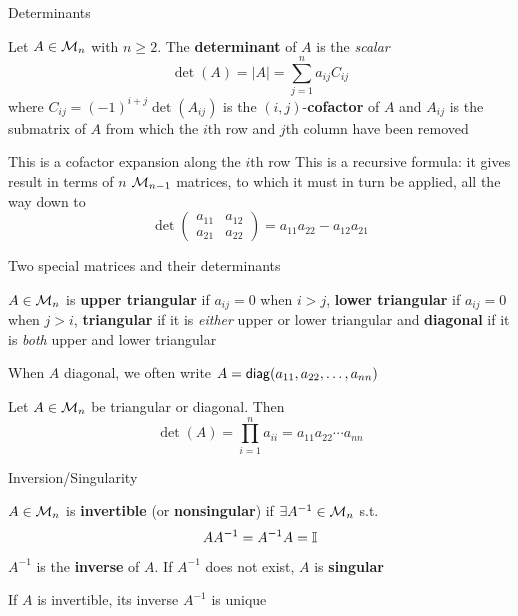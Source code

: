 \documentclass[aspectratio=169]{beamer}\usepackage[]{graphicx}\usepackage[]{xcolor}
\begin{document}
\begin{frame}{Determinants}
\begin{definition}[Determinant]
Let $A\in\mathcal{M}_n$ with $n\geq 2$. The \textbf{determinant} of $A$ is the \emph{scalar}
\[
\det(A)=|A|=\sum_{j=1}^na_{ij}C_{ij}
\]
where $C_{ij}=(-1)^{i+j}\det(A_{ij})$ is the $(i,j)$-\textbf{cofactor} of $A$ and $A_{ij}$ is the submatrix of $A$ from which the $i$th row and $j$th column have been removed
\end{definition}
This is a cofactor expansion along the $i$th row
\vfill
This is a recursive formula: it gives result in terms of $n$ $\mathcal{M}_{n-1}$ matrices, to which it must in turn be applied, all the way down to
\[
\det\left(
\begin{matrix}
a_{11} & a_{12} \\ a_{21} & a_{22}
\end{matrix}\right) = a_{11}a_{22}-a_{12}a_{21}
\]
\end{frame}

\begin{frame}{Two special matrices and their determinants}
\begin{importantdefinition}
$A\in\mathcal{M}_n$ is \textbf{upper triangular} if $a_{ij}=0$ when $i>j$, \textbf{lower triangular} if $a_{ij}=0$ when $j>i$, \textbf{triangular} if it is \emph{either} upper or lower triangular and \textbf{diagonal} if it is \emph{both} upper and lower triangular
\end{importantdefinition}
When $A$ diagonal, we often write $A=\mathsf{diag}(a_{11},a_{22},\ldots,a_{nn})$
\begin{importanttheorem}
Let $A\in\mathcal{M}_n$ be triangular or diagonal. Then
\[
\det(A)=\prod_{i=1}^n a_{ii}=a_{11}a_{22}\cdots a_{nn}
\]
\end{importanttheorem}
\end{frame}

\begin{frame}{Inversion/Singularity}
\begin{importantdefinition}
$A\in\mathcal{M}_n$ is \textbf{invertible} (or \textbf{nonsingular}) if $\exists A^{-1}\in\mathcal{M}_n$ s.t.
\[
AA^{-1}=A^{-1}A=\mathbb{I}
\]
$A^{-1}$ is the \textbf{inverse} of $A$. If $A^{-1}$ does not exist, $A$ is \textbf{singular}
\end{importantdefinition}
\vfill
If $A$ is invertible, its inverse $A^{-1}$ is unique
\end{frame}
\end{document}
